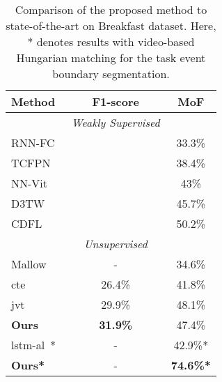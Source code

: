 \documentclass[final]{cvpr}
\begin{document}
\begin{table}[t]
  \caption{{\small Comparison of the proposed method to state-of-the-art on Breakfast dataset. Here, * denotes results with video-based Hungarian matching for the task event boundary segmentation.}}
  \label{tab:det_acc}
  \centering
  \small
  \begin{tabular}{lcc}
    \toprule
    {\bf Method} & {\bf F1-score} & {\bf MoF}\\
    \midrule
    &{\em  Weakly Supervised} & \\
    \midrule
    RNN-FC~\cite{rnnfc-richard2017weakly} &  & 33.3\%   \\
    TCFPN~\cite{tcfpn-ding2018weakly} &  & 38.4\%   \\
    NN-Vit~\cite{nnvit-richard2018neuralnetwork} &  & 43\%   \\
    D3TW~\cite{d3t-chang2019d3tw} &  & 45.7\%   \\
    CDFL~\cite{cdfl-li2019weakly} &  & 50.2\%   \\
    \midrule
     & {\em Unsupervised} & \\
    \midrule
    Mallow~\cite{sener2018unsupervised} & -  & 34.6\%   \\
    {\sc cte}~\cite{kukleva2019unsupervised}    & 26.4\% & 41.8\%      \\
    {\sc jvt}~\cite{vidalmata2020joint} & 29.9\% & 48.1\%      \\
    \hline
    \midrule
    {\bf Ours}     &\textbf{31.9\%}  &  47.4\%  \\
    \midrule
    \midrule
    {\sc lstm-al}~\cite{aakur2019perceptual}* & - & 42.9\%* \\
    {\bf Ours*}  & -  & \textbf{74.6\%*} \\
    \bottomrule
  \end{tabular}
\end{table}
\end{document}
